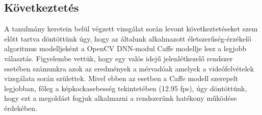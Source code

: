 \subsection{Következtetés}

A tanulmány keretein belül végzett vizsgálat során levont következtetéseket szem előtt tartva döntöttünk úgy, hogy az általunk alkalmazott életszerűség-érzékelő algoritmus modelljeként a OpenCV DNN-modul Caffe modellje lesz a legjobb választás. Figyelembe vettük, hogy egy valós idejű jelenlétkezelő rendszer esetében számunkra azok az eredmények a mérvadóak amelyek a videófelvételek vizsgálata során születtek. Mivel ebben az esetben a Caffe modell szerepelt legjobban, főleg a képkockasebesség tekintetében (12.95 fps), úgy döntöttünk, hogy ezt a megoldást fogjuk alkalmazni a rendszerünk hatékony működése érdekében.